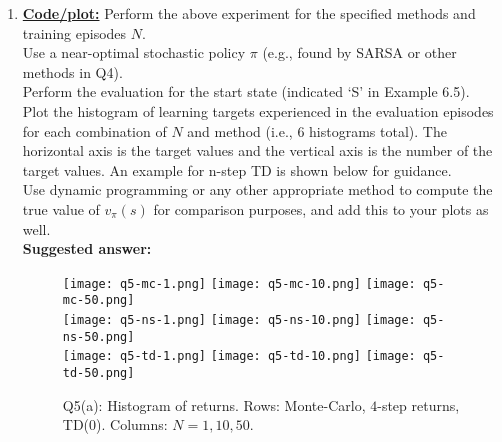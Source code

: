 \documentclass{article}
\newcommand{\solution}[1]{\textbf{Suggested answer:} #1}
\newcommand{\solution}[1]{}
\begin{document}
\begin{enumerate}
	      \begin{enumerate}
		      \item \uline{\textbf{Code/plot:}} Perform the above experiment for the specified methods and training episodes $N$. \\
		            Use a near-optimal stochastic policy $\pi$ (e.g., found by SARSA or other methods in Q4). \\
		            Perform the evaluation for the start state (indicated `S' in Example 6.5). \\
		            Plot the histogram of learning targets experienced in the evaluation episodes for each combination of $N$ and method (i.e., $6$ histograms total). The horizontal axis is the target values and the vertical axis is the number of the target values. An example for n-step TD is shown below for guidance.\\
		            Use dynamic programming or any other appropriate method to compute the true value of $v_\pi(s)$ for comparison purposes, and add this to your plots as well.\\


		            \solution{
			            \begin{figure}[h!]
				            \begin{center}
					            \texttt{[image: q5-mc-1.png]}
					            \hfill
					            \texttt{[image: q5-mc-10.png]}
					            \hfill
					            \texttt{[image: q5-mc-50.png]}
					            \\
					            \texttt{[image: q5-ns-1.png]}
					            \hfill
					            \texttt{[image: q5-ns-10.png]}
					            \hfill
					            \texttt{[image: q5-ns-50.png]}
					            \\
					            \texttt{[image: q5-td-1.png]}
					            \hfill
					            \texttt{[image: q5-td-10.png]}
					            \hfill
					            \texttt{[image: q5-td-50.png]}
				            \end{center}
				            \caption{Q5(a): Histogram of returns. Rows: Monte-Carlo, $4$-step returns, TD($0$). Columns: $N = 1, 10, 50$.}
			            \end{figure}

}
\end{enumerate}
\end{enumerate}
\end{document}
